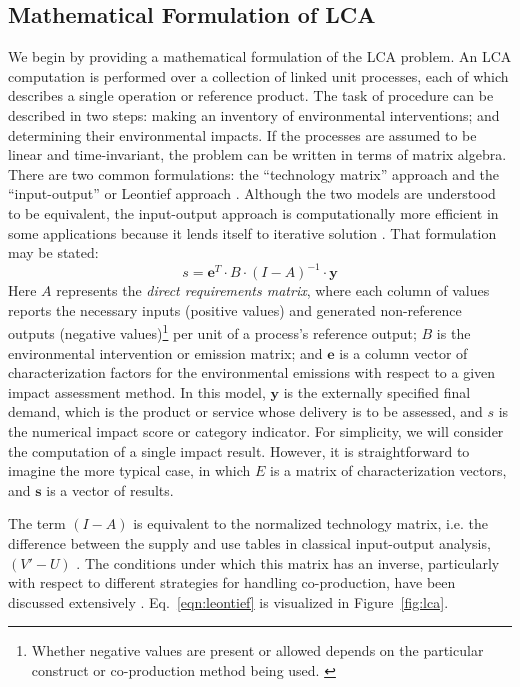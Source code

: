 \subsection{Mathematical Formulation of LCA}

We begin by providing a mathematical formulation of the LCA problem.  An LCA computation is performed over a collection of linked unit processes, each of which describes a single operation or reference product.  The task of procedure can be described in two steps: making an inventory of environmental interventions; and determining their environmental impacts.  If the processes are assumed to be linear and time-invariant, the problem can be written in terms of matrix algebra.  There are two common formulations: the ``technology matrix'' approach and the ``input-output'' or Leontief approach \citep{Heijungs2002, Pauliuk_2015_framework}.  Although the two models are understood to be equivalent, the input-output approach is computationally more efficient in some applications because it lends itself to iterative solution \citep{Peters_JLCA_2007}.  That formulation may be stated:
\begin{equation}
s = \mathbf{e}^T \cdot B \cdot \left(I - A\right)^{-1} \cdot \mathbf{y}
\label{eqn:leontief}
\end{equation}
Here $A$ represents the \emph{direct requirements matrix}, where each column of values reports the necessary inputs (positive values) and generated non-reference outputs (negative values)\footnote{Whether negative values are present or allowed depends on the particular construct or co-production method being used. \cite{Majeau_Bettez_2014}}
per unit of a process's reference output; $B$ is the environmental intervention or emission matrix; and $\mathbf{e}$ is a column vector of characterization factors for the environmental emissions with respect to a given impact assessment method.  In this model, $\mathbf{y}$ is the externally specified final demand, which is the product or service whose delivery is to be assessed, and $s$ is the numerical impact score or category indicator.  For simplicity, we will consider the computation of a single impact result.  However, it is straightforward to imagine the more typical case, in which $E$ is a matrix of characterization vectors, and $\mathbf{s}$ is a vector of results.

The term $(I-A)$ is equivalent to the normalized technology matrix, i.e. the difference between the supply and use tables in classical input-output analysis, $(V'-U)$ \citep{Suh_JIE_2010}.  The conditions under which this matrix has an inverse, particularly with respect to different strategies for handling co-production, have been discussed extensively \citep{Majeau_Bettez_2014}.  Eq.~\ref{eqn:leontief} is visualized in Figure~\ref{fig:lca}. 


